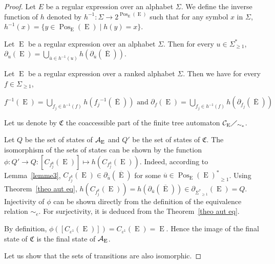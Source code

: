 \documentclass{llncs}
\def\Po#1#2{\Pos_{#1}{(#2)}}
\DeclareMathOperator{\E}{E}
\DeclareMathOperator{\Pos}{Pos}
\def\b#1{\overline{#1}}
\begin{document}
\begin{proof}


Let $E$ be a regular expression over an alphabet $\Sigma$. We define the inverse function of $h$ denoted by $h^{-1}: \Sigma\rightarrow 2^{\Po{\E}{\E}}$ such that for any symbol $x$ in $\Sigma$, $h^{-1}(x)=\{y\in\Po{\E}{\E}\mid h(y)=x\}$. 
 
\begin{theorem}\label{theo aut eq}
  Let $\E$ be a regular expression over an alphabet $\Sigma$. Then for every $u\in \Sigma^*_{\geq 1}$, $\partial_u(\E)=\bigcup_{\b u\in h^{-1}(u)}h(\partial_{\b u}(\b\E))$.
\end{theorem}


\begin{proposition}\label{prop aut eq}
  Let $\E$ be a regular expression over a ranked alphabet $\Sigma$. Then we have for every $f\in\Sigma_{\geq 1}$,
  
  \centerline{
    $f^{-1}(\E)=\bigcup_{f_j\in h^{-1}(f)}h({f_j}^{-1}(\b\E)) \mbox{ and }{\partial_{f}}(\E)=\displaystyle\bigcup_{f_j\in h^{-1}(f)}h({\partial_{f_j}}(\b\E))$ 
  }
\end{proposition}


  Let us denote by $\mathfrak{C}$ the coaccessible part of the finite tree automaton ${\cal C_{\E}}\diagup_{\sim_e}$.
  
  Let $Q$ be the set of states of ${\cal A_{\E}}$ and $Q'$ be the set of states of $\mathfrak{C}$. The isomorphism of the sets of states can be shown by the function $\phi: Q'\rightarrow Q: [C_{f^k_j}(\E)]\mapsto h(C_{f^k_j}(\E))$. Indeed, according to Lemma~\ref{lemme3}, $C_{f^k_j}(\E) \in \partial_{\b u}(\b\E)$ for some $\b u\in{\Po{\E}{\E}^*}_{\geq 1}$. Using Theorem~\ref{theo aut eq}, $h( C_{f^k_j}(\E))=h(\partial_{\b u}(\b\E))\in \partial_{{\Sigma^*}_{\geq 1}}(\E)=Q$. Injectivity of $\phi$ can be shown  directly from the definition of the equivalence relation $\sim_e$. For surjectivity, it is deduced from the Theorem~\ref{theo aut eq}.
  
  By definition, $\phi([C_{{\varepsilon}^1}(\E)])=C_{{\varepsilon}^1}(\E)=\E$. Hence the image of the final state of $\mathfrak{C}$ is the final state of ${\cal A_{\E}}$.
  
  Let us show that the sets of transitions are also isomorphic.
  

\end{proof}
\end{document}
